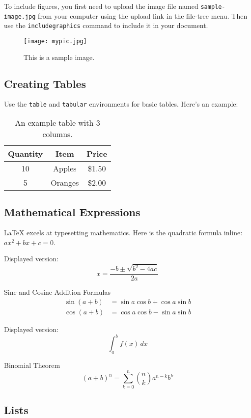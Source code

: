 \documentclass{article}
\begin{document}
	To include figures, you first need to upload the image file named \texttt{sample-image.jpg} from your computer using the upload link in the file-tree menu. Then use the \texttt{includegraphics} command to include it in your document.
	
	\begin{figure}[h]
		\centering
		\texttt{[image: mypic.jpg]}
		\caption{This is a sample image.}
	\end{figure}
	
	\subsection{Creating Tables}
	
	Use the \texttt{table} and \texttt{tabular} environments for basic tables. Here’s an example:
	
	\begin{table}[h]
		\centering
		\begin{tabular}{|c|c|c|}
			\hline
			Quantity & Item    & Price  \\
			\hline
			10       & Apples  & \$1.50 \\
			5        & Oranges & \$2.00 \\
			\hline
		\end{tabular}
		\caption{An example table with 3 columns.}
	\end{table}
	
	\subsection{Mathematical Expressions}
	
	LaTeX excels at typesetting mathematics. Here is the quadratic formula inline: \(ax^2 + bx + c = 0\).
	
	Displayed version:
	\[
	x = \frac{-b \pm \sqrt{b^2 - 4ac}}{2a}
	\]
	
	Sine and Cosine Addition Formulas
	\begin{align}
	\sin(a + b) &= \sin a \cos b + \cos a \sin b \tag{1} \\
	\cos(a + b) &= \cos a \cos b - \sin a \sin b \tag{2}
	\end{align}
	
	Displayed version:
	\[
	\int_{a}^{b} f(x) \, dx
	\]
	
	Binomial Theorem
	\[
	(a + b)^n = \sum_{k=0}^{n} \binom{n}{k} a^{n-k} b^k
	\]
	
	\subsection{Lists}
	
\end{document}
